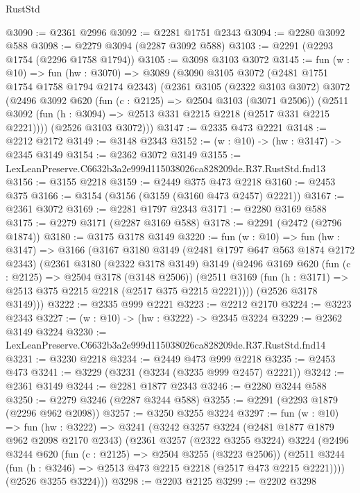 \begin{lexlean}{RustStd}
\begin{coremodule}
@3090 := @2361 @2996
@3092 := @2281 @1751 @2343
@3094 := @2280 @3092 @588
@3098 := @2279 @3094 (@2287 @3092 @588)
@3103 := @2291 (@2293 @1754 (@2296 @1758 @1794))
@3105 := @3098 @3103 @3072
@3145 := fun (w : @10) =>
  fun (hw : @3070) =>
  @3089
    (@3090
      @3105
      @3072
      (@2481 @1751 @1754 @1758 @1794 @2174 @2343)
      (@2361
        @3105
        (@2322 @3103 @3072)
        @3072
        (@2496
          @3092
          @620
          (fun (c : @2125) => @2504 @3103 (@3071 @2506))
          (@2511 @3092 (fun (h : @3094) => @2513 @331 @2215 @2218 (@2517 @331 @2215 @2221))))
        (@2526 @3103 @3072)))
@3147 := @2335 @473 @2221
@3148 := @2212 @2172
@3149 := @3148 @2343
@3152 := (w : @10) -> (hw : @3147) -> @2345 @3149
@3154 := @2362 @3072 @3149
@3155 := LexLeanPreserve.C6632b3a2e999d115038026ca828209de.R37.RustStd.fnd13
@3156 := @3155 @2218
@3159 := @2449 @375 @473 @2218
@3160 := @2453 @375
@3166 := @3154 (@3156 (@3159 (@3160 @473 @2457) @2221))
@3167 := @2361 @3072
@3169 := @2281 @1797 @2343
@3171 := @2280 @3169 @588
@3175 := @2279 @3171 (@2287 @3169 @588)
@3178 := @2291 (@2472 (@2796 @1874))
@3180 := @3175 @3178 @3149
@3220 := fun (w : @10) =>
  fun (hw : @3147) =>
  @3166
    (@3167
      @3180
      @3149
      (@2481 @1797 @647 @563 @1874 @2172 @2343)
      (@2361
        @3180
        (@2322 @3178 @3149)
        @3149
        (@2496
          @3169
          @620
          (fun (c : @2125) => @2504 @3178 (@3148 @2506))
          (@2511 @3169 (fun (h : @3171) => @2513 @375 @2215 @2218 (@2517 @375 @2215 @2221))))
        (@2526 @3178 @3149)))
@3222 := @2335 @999 @2221
@3223 := @2212 @2170
@3224 := @3223 @2343
@3227 := (w : @10) -> (hw : @3222) -> @2345 @3224
@3229 := @2362 @3149 @3224
@3230 := LexLeanPreserve.C6632b3a2e999d115038026ca828209de.R37.RustStd.fnd14
@3231 := @3230 @2218
@3234 := @2449 @473 @999 @2218
@3235 := @2453 @473
@3241 := @3229 (@3231 (@3234 (@3235 @999 @2457) @2221))
@3242 := @2361 @3149
@3244 := @2281 @1877 @2343
@3246 := @2280 @3244 @588
@3250 := @2279 @3246 (@2287 @3244 @588)
@3255 := @2291 (@2293 @1879 (@2296 @962 @2098))
@3257 := @3250 @3255 @3224
@3297 := fun (w : @10) =>
  fun (hw : @3222) =>
  @3241
    (@3242
      @3257
      @3224
      (@2481 @1877 @1879 @962 @2098 @2170 @2343)
      (@2361
        @3257
        (@2322 @3255 @3224)
        @3224
        (@2496
          @3244
          @620
          (fun (c : @2125) => @2504 @3255 (@3223 @2506))
          (@2511 @3244 (fun (h : @3246) => @2513 @473 @2215 @2218 (@2517 @473 @2215 @2221))))
        (@2526 @3255 @3224)))
@3298 := @2203 @2125
@3299 := @2202 @3298

\end{coremodule}
\end{lexlean}

